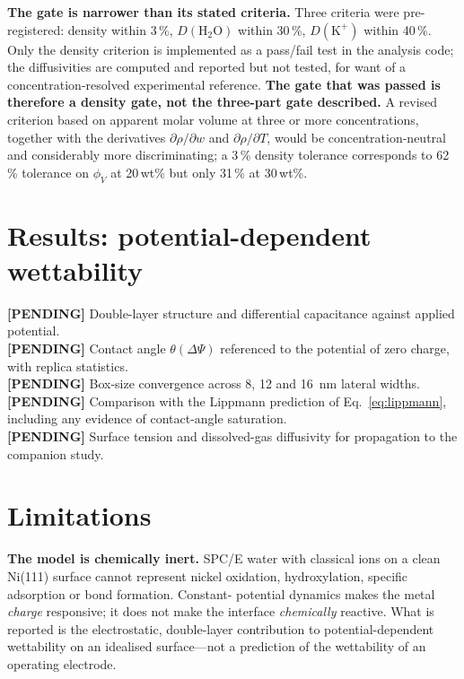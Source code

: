 \documentclass[11pt,a4paper]{article}
\newcommand{\pending}[1]{\textcolor{brick}{\textbf{[PENDING]} #1}}
\begin{document}
\textbf{The gate is narrower than its stated criteria.} Three criteria were pre-registered: density
within 3\,\%, $D(\mathrm{H_2O})$ within 30\,\%, $D(\mathrm{K^+})$ within 40\,\%. Only the
density criterion is implemented as a pass/fail test in the analysis code; the diffusivities are
computed and reported but not tested, for want of a concentration-resolved experimental reference.
\textbf{The gate that was passed is therefore a density gate, not the three-part gate described.}
A revised criterion based on apparent molar volume at three or more concentrations, together with
the derivatives $\partial\rho/\partial w$ and $\partial\rho/\partial T$, would be
concentration-neutral and considerably more discriminating; a 3\,\% density tolerance corresponds
to 62\,\% tolerance on $\phi_V$ at 20\,wt\% but only 31\,\% at 30\,wt\%.

\section{Results: potential-dependent wettability}\label{sec:res-theta}

\pending{Double-layer structure and differential capacitance against applied potential.}\\
\pending{Contact angle $\theta(\Delta\Psi)$ referenced to the potential of zero charge, with replica
statistics.}\\
\pending{Box-size convergence across 8, 12 and \SI{16}{\nano\metre} lateral widths.}\\
\pending{Comparison with the Lippmann prediction of Eq.~\eqref{eq:lippmann}, including any evidence
of contact-angle saturation.}\\
\pending{Surface tension and dissolved-gas diffusivity for propagation to the companion study.}

\section{Limitations}

\textbf{The model is chemically inert.} SPC/E water with classical ions on a clean Ni(111) surface
cannot represent nickel oxidation, hydroxylation, specific adsorption or bond formation. Constant-
potential dynamics makes the metal \emph{charge} responsive; it does not make the interface
\emph{chemically} reactive. What is reported is the electrostatic, double-layer contribution to
potential-dependent wettability on an idealised surface---not a prediction of the wettability of an
operating electrode.
\end{document}
